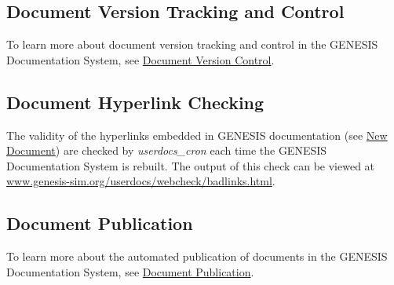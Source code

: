 \documentclass[12pt]{article}
\begin{document}
\subsection*{Document Version Tracking and Control}

To learn more about document version tracking and control in the GENESIS Documentation System, see \href{../version-control/version-control.tex}{Document Version Control}.

\subsection*{Document Hyperlink Checking}

The validity of the hyperlinks embedded in GENESIS documentation (see \href{../NewDocument/NewDocument.tex}{New Document}) are checked by {\it userdocs\_cron} each time the GENESIS Documentation System is rebuilt. The output of this check can be viewed at \href{http://www.genesis-sim.org/userdocs/webcheck/badlinks.html}{www.genesis-sim.org/userdocs/webcheck/badlinks.html}.

\subsection*{Document Publication}

To learn more about the automated publication of documents in the GENESIS Documentation System, see \href{../publication/publication.tex}{Document Publication}.
\end{document}
